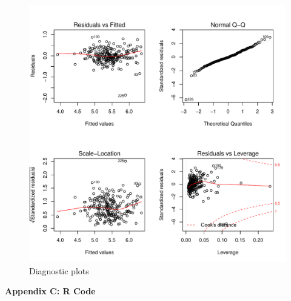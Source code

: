 \documentclass[11pt]{article}\usepackage[]{graphicx}\usepackage[]{color}
\makeatletter
\def\maxwidth{ %
  \ifdim\Gin@nat@width>\linewidth
    \linewidth
  \else
    \Gin@nat@width
  \fi
}
\makeatother
\begin{document}
\begin{figure}[h!] 
\begin{center}

\includegraphics[width=\maxwidth]{figure/unnamed-chunk-14-1} 

\caption{Diagnostic plots}
\label{diag-plot2}
\end{center} 
\end{figure}

\clearpage
\newpage
\noindent \Large{{\bf Appendix C: R Code}}

\end{document}
